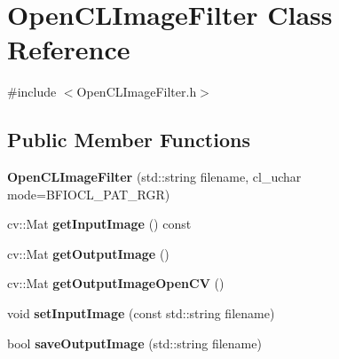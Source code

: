\hypertarget{class_open_c_l_image_filter}{\section{Open\-C\-L\-Image\-Filter Class Reference}
\label{class_open_c_l_image_filter}
}


{\ttfamily \#include $<$Open\-C\-L\-Image\-Filter.\-h$>$}

\subsection*{Public Member Functions}
\begin{DoxyCompactItemize}
\item 
\hypertarget{class_open_c_l_image_filter_ae05569fed56acc2245f8f46cf5f66af2}{{\bfseries Open\-C\-L\-Image\-Filter} (std\-::string filename, cl\-\_\-uchar mode=B\-F\-I\-O\-C\-L\-\_\-\-P\-A\-T\-\_\-\-R\-G\-R)}\label{class_open_c_l_image_filter_ae05569fed56acc2245f8f46cf5f66af2}

\item 
\hypertarget{class_open_c_l_image_filter_a5e9c6964466bb05fe44a107efb5319ea}{cv\-::\-Mat {\bfseries get\-Input\-Image} () const }\label{class_open_c_l_image_filter_a5e9c6964466bb05fe44a107efb5319ea}

\item 
\hypertarget{class_open_c_l_image_filter_a4e6f767fde69a4de606c6f39d5549da1}{cv\-::\-Mat {\bfseries get\-Output\-Image} ()}\label{class_open_c_l_image_filter_a4e6f767fde69a4de606c6f39d5549da1}

\item 
\hypertarget{class_open_c_l_image_filter_af8bd23b6e49df5704a87fe68060a29b3}{cv\-::\-Mat {\bfseries get\-Output\-Image\-Open\-C\-V} ()}\label{class_open_c_l_image_filter_af8bd23b6e49df5704a87fe68060a29b3}

\item 
\hypertarget{class_open_c_l_image_filter_a80f5f1a157eeefbe934ef57c12dbcb9c}{void {\bfseries set\-Input\-Image} (const std\-::string filename)}\label{class_open_c_l_image_filter_a80f5f1a157eeefbe934ef57c12dbcb9c}

\item 
\hypertarget{class_open_c_l_image_filter_a7157584bbdbeda0470e6b637e2145c64}{bool {\bfseries save\-Output\-Image} (std\-::string filename)}\label{class_open_c_l_image_filter_a7157584bbdbeda0470e6b637e2145c64}

\end{DoxyCompactItemize}


